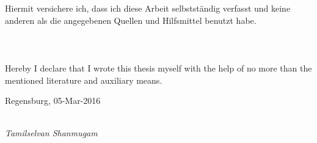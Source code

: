 \newpage

\addtocounter{page}{2}
\begin{large}

\vspace*{6cm}

\noindent
Hiermit versichere ich, dass ich diese Arbeit selbstst\"andig verfasst und keine anderen als die
angegebenen Quellen und Hilfsmittel benutzt habe.\\\\\\\\

Hereby I declare that I wrote this thesis myself with the help of no more than the mentioned literature and auxiliary means.
\vspace{2cm}

\noindent
Regensburg, 05-Mar-2016

\vspace{1cm}

\hspace*{5cm}%
\dotfill\\
\hspace*{9.1cm}%
\textit{Tamilselvan Shanmugam}

\end{large}
